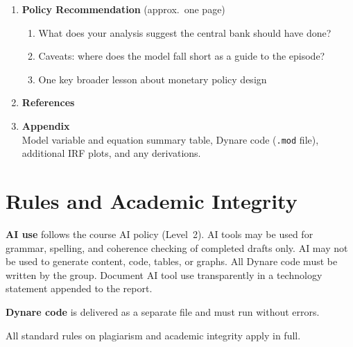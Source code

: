 \documentclass[11pt, a4paper]{article}
\begin{document}
\begin{enumerate}
    \item \textbf{Policy Recommendation} (approx.\ one page)
    \begin{enumerate}[label=(\alph*)]
        \item What does your analysis suggest the central bank should have done?
        \item Caveats: where does the model fall short as a guide to the episode?
        \item One key broader lesson about monetary policy design
    \end{enumerate}

    \item \textbf{References}

    \item \textbf{Appendix}\\
    Model variable and equation summary table, Dynare code (\texttt{.mod} file),
    additional IRF plots, and any derivations.

\end{enumerate}

\section{Rules and Academic Integrity}

\textbf{AI use} follows the course AI policy (Level~2). AI tools may be used
for grammar, spelling, and coherence checking of completed drafts only. AI may
not be used to generate content, code, tables, or graphs. All Dynare code must
be written by the group. Document AI tool use transparently in a technology
statement appended to the report.

\textbf{Dynare code} is delivered as a separate file and must run without errors.

All standard rules on plagiarism and academic integrity apply in full.
\end{document}

